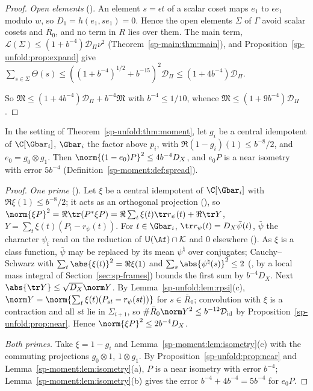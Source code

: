 \begin{proof}
\emph{Open elements} (). An element $s=\epsilon t$ of a
scalar coset maps $e_1$ to $\epsilon e_1$ modulo $w$, so $D_1=h(e_1,se_1)=0$. Hence the open elements $\Sigma$ of
$\Gamma$ avoid scalar cosets and $\bar R_0$, and no term in $R$ lies over them. The main term,
$\mathcal L(\Sigma)\le(1+b^{-4})\mathcal D_\Pi\nu^2$ (Theorem~\ref{sp-main:thm:main}), and
Proposition~\ref{sp-unfold:prop:expand} give
$\sum_{s\in\Sigma}\Theta(s)\le((1+b^{-4})^{1/2}+b^{-15})^2\mathcal D_\Pi\le(1+4b^{-4})\mathcal D_\Pi$.

So $\mathfrak M\le(1+4b^{-4})\mathcal D_\Pi+b^{-4}\mathfrak M$ with $b^{-4}\le1/10$, whence $\mathfrak M\le(1+9b^{-4})\mathcal D_\Pi$.
\end{proof}

\begin{theorem}
\label{sp-unfold:thm:good}
In the setting of Theorem~\ref{sp-unfold:thm:moment}, let $g_i$ be a central idempotent of
$\C[\Gbar_i]$, $\Gbar_i$ the factor above $p_i$, with $\Re(1-g_i)(1)\le b^{-8}/2$, and
$e_0=g_0\otimes g_1$. Then $\norm{(1-e_0)P}^2\le4b^{-4}D_X$, and $e_0P$ is a near isometry with
error $5b^{-4}$ (Definition~\ref{sp-moment:def:spread}).
\end{theorem}

\begin{proof}
\emph{One prime} ().
Let $\xi$ be a central idempotent of $\C[\Gbar_i]$ with $\Re\xi(1)\le b^{-8}/2$; it acts as an
orthogonal projection (), so
$\norm{\xi P}^2=\Re\tr(P^*\xi P)=\Re\sum_t\xi(t)\tr r_\psi(t)+\Re\tr Y$, $Y=\sum_t\xi(t)(P_t-r_\psi(t))$. For
$t\in\Gbar_i$, $\tr r_\psi(t)=D_X\bar\psi(t)$, $\bar\psi$ the character $\psi_{\mathrm f}$ read on the reduction
of $\mathsf U(\Af)\cap\mathcal K$ and $0$ elsewhere ().
As $\xi$ is a class function, $\bar\psi$ may be replaced by its mean $\psi^\natural$ over conjugates;
Cauchy--Schwarz with $\sum_t\abs{\xi(t)}^2=\Re\xi(1)$ and $\sum_s\abs{\psi^\natural(s)}^2\le2$
(, by a local mass integral of
Section~\ref{sec:sp-frames}) bounds the first sum by $b^{-4}D_X$. Next $\abs{\tr Y}\le\sqrt{D_X}\norm
Y$. By Lemma~\ref{sp-unfold:lem:rpsi}(c), $\norm Y=\norm{\sum_t\xi(t)(P_{st}-r_\psi(st))}$ for $s\in\bar
R_0$; convolution with $\xi$ is a contraction and all $st$ lie in $\Sigma_{i+1}$, so $\#\bar
R_0\norm Y^2\le b^{-12}\mathcal D_{\mathrm{id}}$ by Proposition~\ref{sp-unfold:prop:near}. Hence
$\norm{\xi P}^2\le2b^{-4}D_X$.

\emph{Both primes.} Take $\xi=1-g_i$ and Lemma~\ref{sp-moment:lem:isometry}(c) with the commuting
projections $g_0\otimes1$, $1\otimes g_1$. By Proposition~\ref{sp-unfold:prop:near} and
Lemma~\ref{sp-moment:lem:isometry}(a), $P$ is a near isometry with error $b^{-4}$; Lemma~\ref{sp-moment:lem:isometry}(b) gives the error $b^{-4}+4b^{-4}=5b^{-4}$
for $e_0P$.
\end{proof}
